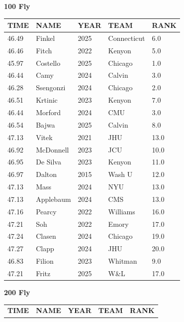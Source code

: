 \begin{table}[H]
\centering
\begin{minipage}[t]{0.48\textwidth}
\centering
\textbf{100 Fly}\\[0.1cm]
\begin{tabular}{@{}p{1.8cm}p{2.8cm}p{1.2cm}p{1.4cm}p{0.8cm}@{}}
\hline
    \textbf{TIME} & \textbf{NAME} & \textbf{YEAR} & \textbf{TEAM} & \textbf{RANK} \\
\hline
    46.49 & Finkel & 2025 & Connecticut & 6.0 \\
    46.46 & Fitch & 2022 & Kenyon & 5.0 \\
    45.97 & Costello & 2025 & Chicago & 1.0 \\
    46.44 & Camy & 2024 & Calvin & 3.0 \\
    46.28 & Ssengonzi & 2024 & Chicago & 2.0 \\
    46.51 & Krtinic & 2023 & Kenyon & 7.0 \\
    46.44 & Morford & 2024 & CMU & 3.0 \\
    46.54 & Bajwa & 2025 & Calvin & 8.0 \\
    47.13 & Vitek & 2021 & JHU & 13.0 \\
    46.92 & McDonnell & 2023 & JCU & 10.0 \\
    46.95 & De Silva & 2023 & Kenyon & 11.0 \\
    46.97 & Dalton & 2015 & Wash U & 12.0 \\
    47.13 & Mass & 2024 & NYU & 13.0 \\
    47.13 & Applebaum & 2024 & CMS & 13.0 \\
    47.16 & Pearcy & 2022 & Williams & 16.0 \\
    47.21 & Soh & 2022 & Emory & 17.0 \\
    47.24 & Clasen & 2024 & Chicago & 19.0 \\
    47.27 & Clapp & 2024 & JHU & 20.0 \\
    46.83 & Filion & 2023 & Whitman & 9.0 \\
    47.21 & Fritz & 2025 & W\&L & 17.0 \\
\hline
\end{tabular}
\end{minipage}\hfill
\begin{minipage}[t]{0.48\textwidth}
\centering
\textbf{200 Fly}\\[0.1cm]
\begin{tabular}{@{}p{1.8cm}p{2.8cm}p{1.2cm}p{1.4cm}p{0.8cm}@{}}
\hline
    \textbf{TIME} & \textbf{NAME} & \textbf{YEAR} & \textbf{TEAM} & \textbf{RANK} \\

\end{tabular}
\end{minipage}
\end{table}
